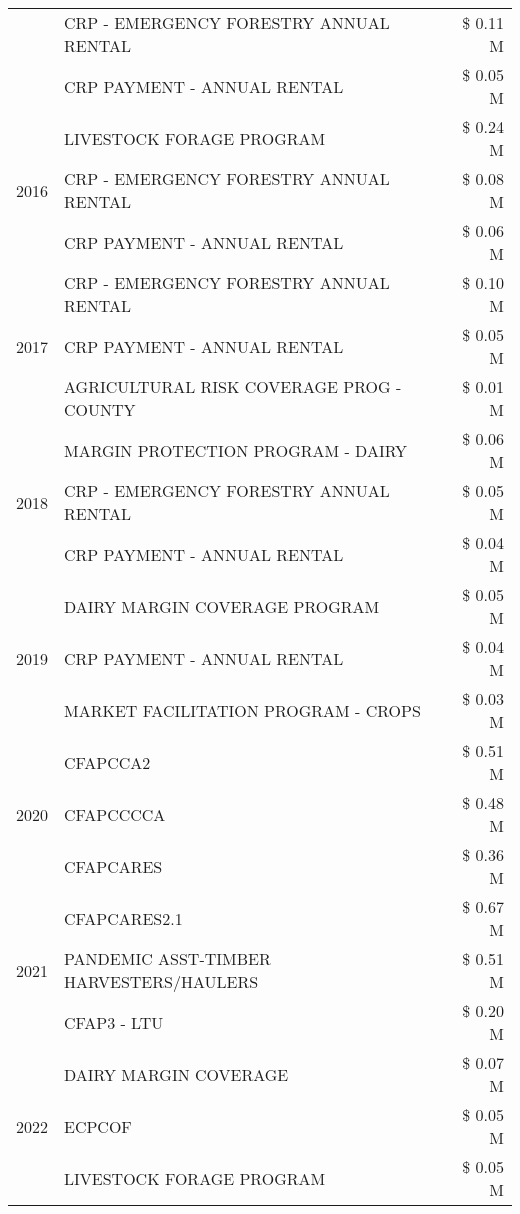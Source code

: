 \begin{tabular}{llr}
 & CRP - EMERGENCY FORESTRY ANNUAL RENTAL & \$ 0.11 M \\
 & CRP PAYMENT - ANNUAL RENTAL & \$ 0.05 M \\
\cline{1-3}
\multirow[t]{3}{*}{2016} & LIVESTOCK FORAGE PROGRAM & \$ 0.24 M \\
 & CRP - EMERGENCY FORESTRY ANNUAL RENTAL & \$ 0.08 M \\
 & CRP PAYMENT - ANNUAL RENTAL & \$ 0.06 M \\
\cline{1-3}
\multirow[t]{3}{*}{2017} & CRP - EMERGENCY FORESTRY ANNUAL RENTAL & \$ 0.10 M \\
 & CRP PAYMENT - ANNUAL RENTAL & \$ 0.05 M \\
 & AGRICULTURAL RISK COVERAGE PROG - COUNTY & \$ 0.01 M \\
\cline{1-3}
\multirow[t]{3}{*}{2018} & MARGIN PROTECTION PROGRAM - DAIRY & \$ 0.06 M \\
 & CRP - EMERGENCY FORESTRY ANNUAL RENTAL & \$ 0.05 M \\
 & CRP PAYMENT - ANNUAL RENTAL & \$ 0.04 M \\
\cline{1-3}
\multirow[t]{3}{*}{2019} & DAIRY MARGIN COVERAGE PROGRAM & \$ 0.05 M \\
 & CRP PAYMENT - ANNUAL RENTAL & \$ 0.04 M \\
 & MARKET FACILITATION PROGRAM - CROPS & \$ 0.03 M \\
\cline{1-3}
\multirow[t]{3}{*}{2020} & CFAPCCA2 & \$ 0.51 M \\
 & CFAPCCCCA & \$ 0.48 M \\
 & CFAPCARES & \$ 0.36 M \\
\cline{1-3}
\multirow[t]{3}{*}{2021} & CFAPCARES2.1 & \$ 0.67 M \\
 & PANDEMIC ASST-TIMBER HARVESTERS/HAULERS & \$ 0.51 M \\
 & CFAP3 - LTU & \$ 0.20 M \\
\cline{1-3}
\multirow[t]{3}{*}{2022} & DAIRY MARGIN COVERAGE & \$ 0.07 M \\
 & ECPCOF & \$ 0.05 M \\
 & LIVESTOCK FORAGE PROGRAM & \$ 0.05 M \\
\cline{1-3}
\bottomrule
\end{tabular}
